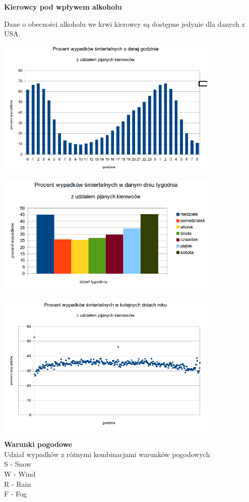 \textbf{Kierowcy pod wpływem alkoholu}

Dane o obecności alkoholu we krwi kierowcy są dostępne jedynie dla
danych z USA.

\centerline{\includegraphics[width=0.8\textwidth]{images/hipotheses/drunk_drivers/hour.png}}

\centerline{\includegraphics[width=0.8\textwidth]{images/hipotheses/drunk_drivers/day_of_week.png}}

\centerline{\includegraphics[width=0.8\textwidth]{images/hipotheses/drunk_drivers/day_of_year.png}}

\textbf{Warunki pogodowe}\\Udział wypadków z różnymi kombinacjami
warunków pogodowych\\S - Snow\\W - Wind\\R - Rain\\F - Fog

